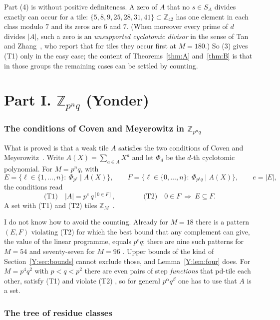 \documentclass[11pt,a4paper]{amsart}
\theoremstyle{definition}
\theoremstyle{remark}
\newcommand{\Z}{\mathbb{Z}}
\begin{document}
Part (4) is \cite[Prop.~4.1]{KLMS} without positive definiteness. A zero of $A$ that no $s\in S_A$ divides
exactly can occur for a tile: $\{5,8,9,25,28,31,41\}\subset\Z_{42}$ has one element in each class modulo $7$ and
its zeros are $6$ and $7$. (When moreover every prime of $d$ divides $|A|$, such a zero is an \emph{unsupported
cyclotomic divisor} in the sense of Tan and Zhang~\cite{TZ}, who report that for tiles they occur first at $M=180$.) So
(3) gives (T1) only in the easy case; the content of Theorems~\ref{thm:A} and~\ref{thm:B} is that in those groups the remaining cases can be settled
by counting.


\part*{Part I. \texorpdfstring{$\Z_{p^nq}$}{Z\_{p\^{}nq}} (Yonder)}

\section{The conditions of Coven and Meyerowitz in \texorpdfstring{$\Z_{p^nq}$}{p\^{}nq}}\label{Y:sec:cm}

What is proved is that a weak tile $A$ satisfies the two conditions of Coven and Meyerowitz~\cite{CM}. Write
$A(X)=\sum_{a\in A}X^a$ and let $\Phi_d$ be the $d$-th cyclotomic polynomial. For $M=p^nq$, with
\[
 E=\{\ell\in\{1,\dots,n\}:\ \Phi_{p^\ell}\mid A(X)\},\qquad
 F=\{\ell\in\{0,\dots,n\}:\ \Phi_{p^\ell q}\mid A(X)\},\qquad e=|E|,
\]
the conditions read
\[
 \text{(T1)}\quad |A|=p^{e}\,q^{[0\in F]},\qquad\qquad \text{(T2)}\quad 0\in F\ \Longrightarrow\ E\subseteq F .
\]
A set with (T1) and (T2) tiles $\Z_M$~\cite{CM}.


I do not know how to avoid the counting. Already for $M=18$ there is a pattern $(E,F)$ violating (T2) for which
the best bound that any complement can give, the value of the linear programme, equals $p^eq$; there are nine
such patterns for $M=54$ and seventy-seven for $M=96$ \cite{Ynote}. Upper bounds of the kind of Section~\ref{Y:sec:bounds} cannot exclude
those, and Lemma~\ref{Y:lem:four} does. For $M=p^4q^2$ with $p<q<p^2$ there are even pairs of step
\emph{functions} that pd-tile each other, satisfy (T1) and violate (T2) \cite[Theorem~1.4]{KLMS}, so for
general $p^\alpha q^\beta$ one has to use that $A$ is a set.

\section{The tree of residue classes}\label{Y:sec:tree}
\end{document}
